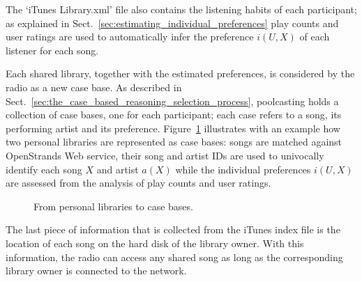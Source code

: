 The `iTunes Library.xml' file also contains the listening habits of each participant; as explained in Sect.~\ref{sec:estimating_individual_preferences} play counts and user ratings are used to automatically infer the preference $i(U,X)$ of each listener for each song.

Each shared library, together with the estimated preferences, is considered by the radio as a new case base.
As described in Sect.~\ref{sec:the_case_based_reasoning_selection_process}, poolcasting holds a collection of case bases, one for each participant;
each case refers to a song, its performing artist and its preference. Figure~\ref{fig:casebases} illustrates with an example how two personal libraries are represented as case bases: songs are matched against OpenStrands Web service, their song and artist IDs are used to univocally identify each song $X$ and artist $a(X)$ while the individual preferences $i(U,X)$ are assessed from the analysis of play counts and user ratings.
%
\begin{figure}[bthp]
\centering \setlength{\abovecaptionskip}{3pt}
\caption{From personal libraries to case bases.}
\label{fig:casebases}
\end{figure}

The last piece of information that is collected from the iTunes index file is the location of each song on the hard disk of the library owner.
With this information, the radio can access any shared song as long as the corresponding library owner is connected to the network.




